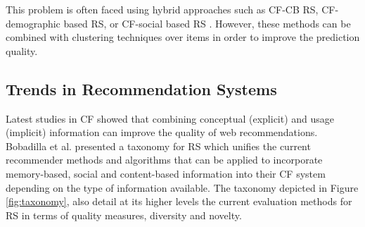 This problem is often faced using hybrid approaches such as CF-CB RS, CF-demographic based RS, or CF-social based RS \cite{bobadilla2013recommender}. However, these methods can be combined with clustering techniques over items in order to improve the prediction quality.

\subsection{Trends in Recommendation Systems}

Latest studies in CF showed that combining conceptual (explicit) and usage (implicit) information can improve the quality of web recommendations. Bobadilla et al. \cite{bobadilla2013recommender} presented a taxonomy for RS which unifies the current recommender methods and algorithms that can be applied to incorporate memory-based, social and content-based information into their CF system depending on the type of information available. The taxonomy depicted in Figure \ref{fig:taxonomy}, also detail at its higher levels the current evaluation methods for RS in terms of quality measures, diversity and novelty.


